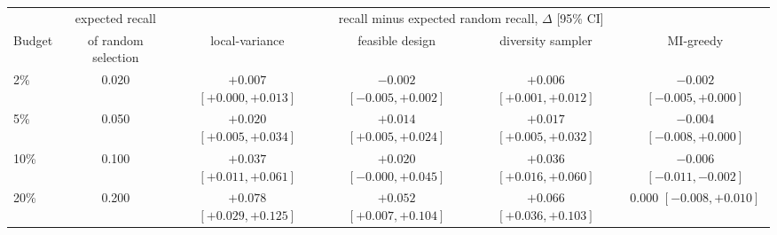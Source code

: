 \begin{tabular}{lccccc}
\toprule
 & expected recall & \multicolumn{4}{c}{recall minus expected random recall, $\Delta$ [95\% CI]} \\
\cmidrule(lr){3-6}
Budget & of random selection & local-variance & feasible design & diversity sampler & MI-greedy \\
\midrule
2\% & 0.020 & ${+}0.007$ $[{+}0.000, {+}0.013]$ & $-0.002$ $[-0.005, {+}0.002]$ & ${+}0.006$ $[{+}0.001, {+}0.012]$ & $-0.002$ $[-0.005, {+}0.000]$ \\
5\% & 0.050 & ${+}0.020$ $[{+}0.005, {+}0.034]$ & ${+}0.014$ $[{+}0.005, {+}0.024]$ & ${+}0.017$ $[{+}0.005, {+}0.032]$ & $-0.004$ $[-0.008, {+}0.000]$ \\
10\% & 0.100 & ${+}0.037$ $[{+}0.011, {+}0.061]$ & ${+}0.020$ $[-0.000, {+}0.045]$ & ${+}0.036$ $[{+}0.016, {+}0.060]$ & $-0.006$ $[-0.011, -0.002]$ \\
20\% & 0.200 & ${+}0.078$ $[{+}0.029, {+}0.125]$ & ${+}0.052$ $[{+}0.007, {+}0.104]$ & ${+}0.066$ $[{+}0.036, {+}0.103]$ & $0.000$ $[-0.008, {+}0.010]$ \\
\bottomrule
\end{tabular}